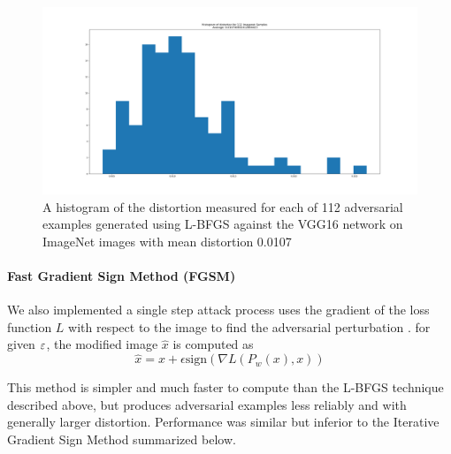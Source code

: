 
\begin{figure}[H]
\label{lbfgsi}
\includegraphics[trim=200 80 100 100, clip,width=14cm]{c1_figures/distortion_hist.png}
\caption{A histogram of the distortion measured for each of 112 adversarial examples generated using L-BFGS against the VGG16 network on ImageNet images with mean distortion 0.0107}
\end{figure}

\paragraph{Fast Gradient Sign Method (FGSM)} 

  We also implemented a single step attack process uses the gradient of the loss function $L$ with respect to the image to find the adversarial perturbation \cite{goodfellow_explaining_2014}. for given $\varepsilon$, the modified image $\hat x$ is computed as
\begin{equation}
\hat{x} = x + \epsilon \text{sign} (\nabla L (P_w(x),x))
\end{equation}

This method is simpler and much faster to compute than the L-BFGS technique described above, but produces adversarial examples less reliably and with generally larger distortion. Performance was similar but inferior to the Iterative Gradient Sign Method summarized below.  

